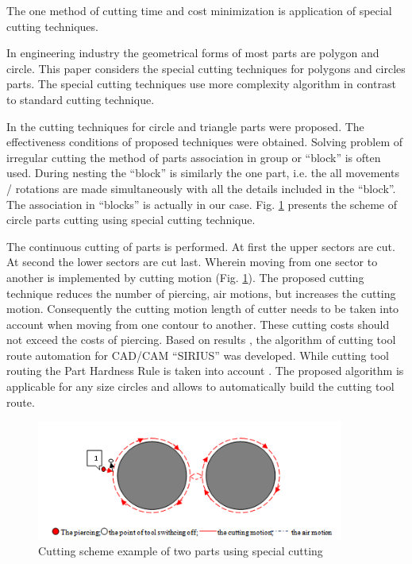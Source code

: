 \documentclass[runningheads]{llncs}
\begin{document}
The one method of cutting time and cost minimization is application of special cutting techniques.

In engineering industry the geometrical forms of most parts are polygon and circle.
This paper considers the special cutting techniques for polygons and circles parts.
The special cutting techniques use more complexity algorithm in contrast to standard cutting technique.

In \cite{ru26} the cutting techniques for circle and triangle parts were proposed.
The effectiveness conditions of proposed techniques were obtained.
Solving problem of irregular cutting the method of parts association
in group or ``block'' is often used.
During nesting the ``block'' is similarly the one part,
i.e. the all movements / rotations are made simultaneously
with all the details included in the ``block''.
The association in ``blocks'' is actually in our case.
Fig. \ref{8} presents the scheme of circle parts cutting using special cutting technique.

The continuous cutting of parts is performed.
At first the upper sectors are cut.
At second the lower sectors are cut last.
Wherein moving from one sector to another is implemented by cutting motion (Fig. \ref{8}).
The proposed cutting technique reduces the number of piercing, air motions,
but increases the cutting motion.
Consequently the cutting motion length of cutter needs to be taken into account
when moving from one contour to another.
These cutting costs should not exceed the costs of piercing.
Based on results \cite{ru26},
the algorithm of cutting tool route automation for CAD/CAM ``SIRIUS'' was developed.
While cutting tool routing the Part Hardness Rule is taken into account \cite{ru27}.
The proposed algorithm is applicable for any size circles
and allows to automatically build the cutting tool route.

\begin{figure}
  \begin{center}
  \includegraphics[width=0.9\textwidth]{8.png}
  \caption{Cutting scheme example of two parts using special cutting}
  \label{8}
  \end{center}
\end{figure}
\end{document}
